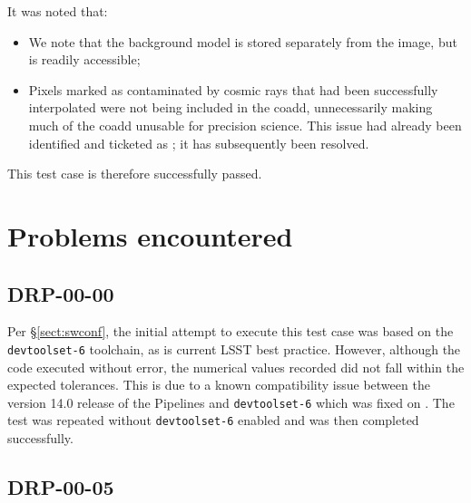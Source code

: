 \documentclass[DM,lsstdraft,STR,toc]{lsstdoc}
\begin{document}
It was noted that:

\begin{itemize}

  \item{We note that the background model is stored separately from the image, but is readily accessible;}
  \item{
    Pixels marked as contaminated by cosmic rays that had been successfully interpolated were not being included in the coadd, unnecessarily making much of the coadd unusable for precision science.
    This issue had already been identified and ticketed as ; it has subsequently been resolved.
  }

\end{itemize}

This test case is therefore successfully passed.

\section{Problems encountered}

\subsection{DRP-00-00}
\label{sect:problems-drp-00-00}

Per \S\ref{sect:swconf}, the initial attempt to execute this test case was based on the \texttt{devtoolset-6} toolchain, as is current LSST best practice.
However, although the code executed without error, the numerical values recorded did not fall within the expected tolerances.
This is due to a known compatibility issue between the version 14.0 release of the Pipelines and \texttt{devtoolset-6} which was fixed on .
The test was repeated without \texttt{devtoolset-6} enabled and was then completed successfully.

\subsection{DRP-00-05}
\label{sect:problems-drp-00-05}
\end{document}
